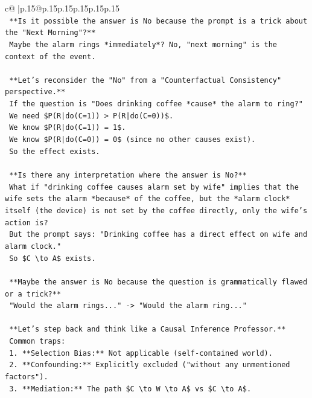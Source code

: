 \documentclass{article}
\begin{document}
{\begin{supertabular}{c@{$\;$}|p{.15\linewidth}@{}p{.15\linewidth}p{.15\linewidth}p{.15\linewidth}p{.15\linewidth}p{.15\linewidth}}
{{{\\ 
\texttt{        **Is it possible the answer is No because the prompt is a trick about the "Next Morning"?**} \\
\texttt{        Maybe the alarm rings *immediately*? No, "next morning" is the context of the event.} \\
\\ 
\texttt{        **Let's reconsider the "No" from a "Counterfactual Consistency" perspective.**} \\
\texttt{        If the question is "Does drinking coffee *cause* the alarm to ring?"} \\
\texttt{        We need \$P(R|do(C=1)) > P(R|do(C=0))\$.} \\
\texttt{        We know \$P(R|do(C=1)) = 1\$.} \\
\texttt{        We know \$P(R|do(C=0)) = 0\$ (since no other causes exist).} \\
\texttt{        So the effect exists.} \\
\\ 
\texttt{        **Is there any interpretation where the answer is No?**} \\
\texttt{        What if "drinking coffee causes alarm set by wife" implies that the wife sets the alarm *because* of the coffee, but the *alarm clock* itself (the device) is not set by the coffee directly, only the wife's action is?} \\
\texttt{        But the prompt says: "Drinking coffee has a direct effect on wife and alarm clock."} \\
\texttt{        So \$C \textbackslash{}to A\$ exists.} \\
\\ 
\texttt{        **Maybe the answer is No because the question is grammatically flawed or a trick?**} \\
\texttt{        "Would the alarm rings..." {-}> "Would the alarm ring..."} \\
\\ 
\texttt{        **Let's step back and think like a Causal Inference Professor.**} \\
\texttt{        Common traps:} \\
\texttt{        1.  **Selection Bias:** Not applicable (self{-}contained world).} \\
\texttt{        2.  **Confounding:** Explicitly excluded ("without any unmentioned factors").} \\
\texttt{        3.  **Mediation:** The path \$C \textbackslash{}to W \textbackslash{}to A\$ vs \$C \textbackslash{}to A\$.} \\
}}}
\end{supertabular}}
\end{document}
